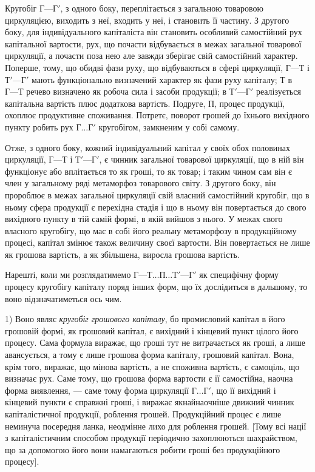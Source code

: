 Кругобіг $Г — Г'$, з одного боку, переплітається з загальною товаровою
циркуляцією, виходить з неї, входить у неї, і становить її частину. З другого
боку, для індивідуального капіталіста він становить особливий самостійний
рух капітальної вартости, рух, що почасти відбувається в межах загальної
товарової циркуляції, а почасти поза нею але завжди зберігає свій самостійний
характер. Поперше, тому, що обидві фази руху, що відбуваються
в сфері циркуляції, $Г — Т$ і $Т' — Г'$ мають функціонально визначений
характер як фази руху капіталу; $Т$ в $Г — Т$ речево визначено як
робоча сила і засоби продукції; в $Т' — Г'$ реалізується капітальна вартість
плюс додаткова вартість. Подруге, $П$, процес продукції, охоплює продуктивне
споживання. Потретє, поворот грошей до їхнього вихідного пункту
робить рух $Г\dots{} Г'$ кругобігом, замкненим у собі самому.

Отже, з одного боку, кожний індивідуальний капітал у своїх обох
половинах циркуляції, $Г — Т$ і $Т' — Г'$, є чинник загальної товарової
циркуляції, що в ній він функціонує або вплітається то як гроші, то як
товар; і таким чином сам він є член у загальному ряді метаморфоз товарового
світу. З другого боку, він пророблює в межах загальної циркуляції свій
власний самостійний кругобіг, що в ньому сфера продукції є перехідна
стадія і що в ньому він повертається до свого вихідного пункту в тій
самій формі, в якій вийшов з нього. У межах свого власного кругобігу,
що має в собі його реальну метаморфозу в продукційному процесі,
капітал змінює також величину своєї вартости. Він повертається не лише
як грошова вартість, а як збільшена, виросла грошова вартість.

Нарешті, коли ми розглядатимемо $Г — Т\dots{} П\dots{} Т' — Г'$ як специфічну
форму процесу кругобігу капіталу поряд інших форм, що їх дослідиться
в дальшому, то воно відзначатиметься ось чим.

1) Воно являє \emph{кругобіг грошового капіталу}, бо промисловий капітал
в його грошовій формі, як грошовий капітал, є вихідний і кінцевий
пункт цілого його процесу. Сама формула виражає, що гроші тут не
витрачається як гроші, а лише авансується, а тому є лише грошова
форма капіталу, грошовий капітал. Вона, крім того, виражає, що мінова
вартість, а не споживна вартість, є самоціль, що визначає рух. Саме тому,
що грошова форма вартости є її самостійна, наочна форма виявлення, —
саме тому форма циркуляції $Г\dots{} Г'$, що її вихідний і кінцевий
пункти є справжні гроші, і виражає якнайнаочніше движний чинник
капіталістичної продукції, роблення грошей. Продукційний процес
є лише неминуча посередня ланка, неодмінне лихо для роблення грошей.
[Тому всі нації з капіталістичним способом продукції періодично захоплюються
шахрайством, що за допомогою його вони намагаються робити
гроші без продукційного процесу].


